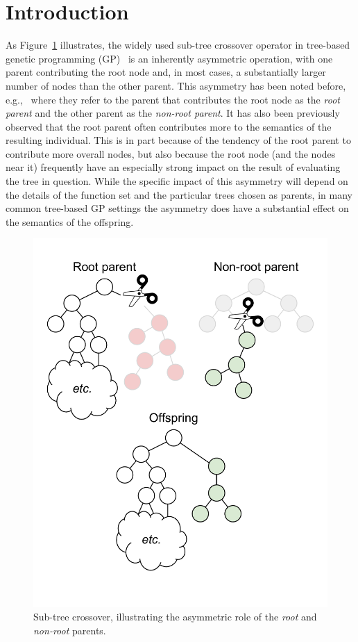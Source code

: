 \documentclass{sig-alternate}
\begin{document}
\category{}{}{}
\terms{}

\section{Introduction} \label{sec:Introduction}

As Figure~\ref{fig:root_parent_illustration} illustrates, the widely used sub-tree crossover operator in tree-based 
genetic programming (GP)~\cite{poli08:fieldguide} is an inherently
asymmetric operation, with one parent contributing the root node and, in most cases, a substantially larger
number of nodes than the other parent. This asymmetry has been noted before, e.g.,~\cite{mcphee1999analysis}
where they refer to the parent that contributes the root node as the \emph{root parent} and the other parent as
the \emph{non-root parent}.
It has also been previously observed 
\cite{McPheeDonatucciDramdahl:2014, McPhee:2008:SBB:1792694.1792707} 
that the root parent often contributes more to the semantics of the resulting 
individual. This is in part because of the tendency of the root parent to contribute more 
overall nodes, but also because the root node (and the nodes near it) frequently have an especially 
strong impact on the result of evaluating the tree in question. While the specific impact of this asymmetry will 
depend on the details of the function set and the particular trees chosen as parents, in many common 
tree-based GP settings the asymmetry does have a substantial effect on the semantics of the offspring.

\begin{figure}
\centering
\includegraphics[width=0.45 \textwidth]{Plots/Root_parent_illustration_no_triangle.pdf}
\caption{Sub-tree crossover, illustrating the asymmetric role of the \emph{root} and \emph{non-root} parents.}
\label{fig:root_parent_illustration}
\end{figure}
\end{document}
